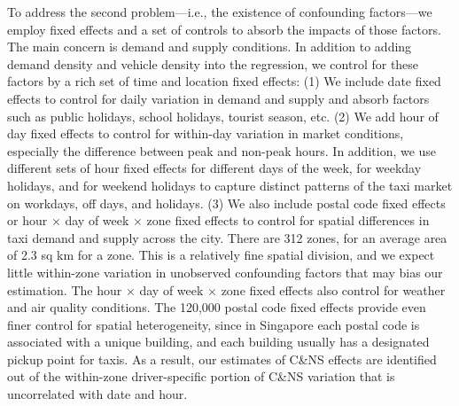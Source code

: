 \documentclass[reviewmode]{AEA}
\begin{document}
To address the second problem---i.e., the existence of confounding factors---we employ fixed effects and a set of controls to absorb the impacts of those factors. The main concern is  demand and supply conditions. In addition to adding demand density and vehicle density into the regression, we control for these factors by a rich set of time and location fixed effects: (1) We include date fixed effects to control for daily variation in demand and supply and absorb factors such as public holidays, school holidays, tourist season, etc. (2) We add hour of day fixed effects to control for within-day variation in market conditions, especially the difference between peak and non-peak hours. In addition, we use different sets of hour fixed effects for different days of the week, for weekday holidays, and for weekend holidays to capture distinct patterns of the taxi market on workdays, off days, and holidays. (3)  We also include postal code fixed effects or hour $\times$ day of week $\times$ zone fixed effects to control for spatial differences in taxi demand and supply across the city. There are 312 zones, for an average area of 2.3 sq km for a zone. This is a relatively fine spatial division, and we expect little within-zone variation in unobserved confounding factors that may bias our estimation. The  hour $\times$ day of week $\times$ zone fixed effects also control for weather and air quality conditions. The 120,000 postal code fixed effects provide even finer control for spatial heterogeneity, since in Singapore each postal code is associated with a unique building, and each building usually has a designated pickup point for taxis. As a result, our estimates of C\&NS effects are identified out of the within-zone driver-specific portion of C\&NS variation that is uncorrelated with date and hour. %
\end{document}
